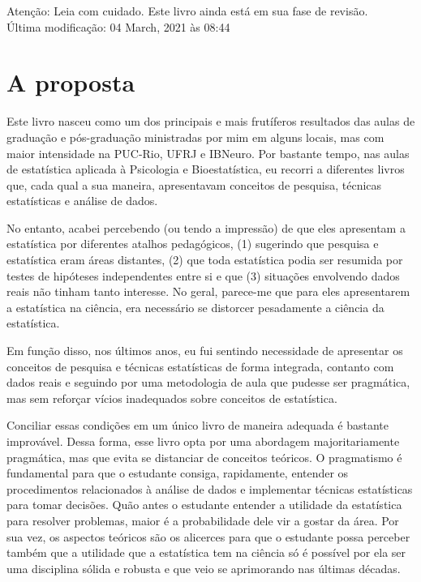 \documentclass[
]{book}
\begin{document}
Atenção: Leia com cuidado. Este livro ainda está em sua fase de revisão.\\
Última modificação: 04 March, 2021 às 08:44

\hypertarget{a-proposta}{%
\section{A proposta}\label{a-proposta}}

Este livro nasceu como um dos principais e mais frutíferos resultados das aulas de graduação e pós-graduação ministradas por mim em alguns locais, mas com maior intensidade na PUC-Rio, UFRJ e IBNeuro. Por bastante tempo, nas aulas de estatística aplicada à Psicologia e Bioestatística, eu recorri a diferentes livros que, cada qual a sua maneira, apresentavam conceitos de pesquisa, técnicas estatísticas e análise de dados.

No entanto, acabei percebendo (ou tendo a impressão) de que eles apresentam a estatística por diferentes atalhos pedagógicos, (1) sugerindo que pesquisa e estatística eram áreas distantes, (2) que toda estatística podia ser resumida por testes de hipóteses independentes entre si e que (3) situações envolvendo dados reais não tinham tanto interesse. No geral, parece-me que para eles apresentarem a estatística na ciência, era necessário se distorcer pesadamente a ciência da estatística.

Em função disso, nos últimos anos, eu fui sentindo necessidade de apresentar os conceitos de pesquisa e técnicas estatísticas de forma integrada, contanto com dados reais e seguindo por uma metodologia de aula que pudesse ser pragmática, mas sem reforçar vícios inadequados sobre conceitos de estatística.

Conciliar essas condições em um único livro de maneira adequada é bastante improvável. Dessa forma, esse livro opta por uma abordagem majoritariamente pragmática, mas que evita se distanciar de conceitos teóricos. O pragmatismo é fundamental para que o estudante consiga, rapidamente, entender os procedimentos relacionados à análise de dados e implementar técnicas estatísticas para tomar decisões. Quão antes o estudante entender a utilidade da estatística para resolver problemas, maior é a probabilidade dele vir a gostar da área. Por sua vez, os aspectos teóricos são os alicerces para que o estudante possa perceber também que a utilidade que a estatística tem na ciência só é possível por ela ser uma disciplina sólida e robusta e que veio se aprimorando nas últimas décadas.
\end{document}
